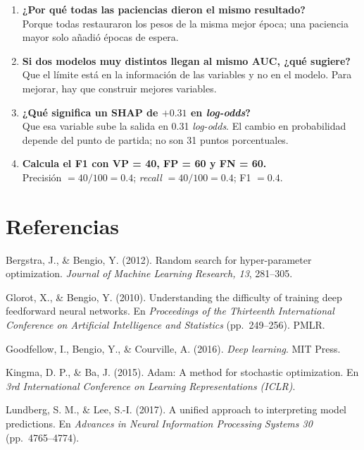 \documentclass[11pt,a4paper]{article}
\begin{document}
\begin{enumerate}[label=\textbf{\arabic*.}, leftmargin=*]
\item \textbf{¿Por qué todas las paciencias dieron el mismo resultado?}\\
Porque todas restauraron los pesos de la misma mejor época; una paciencia mayor solo añadió épocas de espera.

\item \textbf{Si dos modelos muy distintos llegan al mismo AUC, ¿qué sugiere?}\\
Que el límite está en la información de las variables y no en el modelo. Para mejorar, hay que construir mejores variables.

\item \textbf{¿Qué significa un SHAP de $+0.31$ en \textit{log-odds}?}\\
Que esa variable sube la salida en 0.31 \textit{log-odds}. El cambio en probabilidad depende del punto de partida; no son 31 puntos porcentuales.

\item \textbf{Calcula el F1 con VP = 40, FP = 60 y FN = 60.}\\
Precisión $=40/100=0.4$; \textit{recall} $=40/100=0.4$; F1 $=0.4$.
\end{enumerate}

\section*{Referencias}
\begingroup
\setlength{\parindent}{-1cm}\setlength{\leftskip}{1cm}\setlength{\parskip}{4pt}\small

Bergstra, J., \& Bengio, Y. (2012). Random search for hyper-parameter optimization. \textit{Journal of Machine Learning Research, 13}, 281--305.

Glorot, X., \& Bengio, Y. (2010). Understanding the difficulty of training deep feedforward neural networks. En \textit{Proceedings of the Thirteenth International Conference on Artificial Intelligence and Statistics} (pp.~249--256). PMLR.

Goodfellow, I., Bengio, Y., \& Courville, A. (2016). \textit{Deep learning}. MIT Press.

Kingma, D. P., \& Ba, J. (2015). Adam: A method for stochastic optimization. En \textit{3rd International Conference on Learning Representations (ICLR)}.

Lundberg, S. M., \& Lee, S.-I. (2017). A unified approach to interpreting model predictions. En \textit{Advances in Neural Information Processing Systems 30} (pp.~4765--4774).
\end{document}
